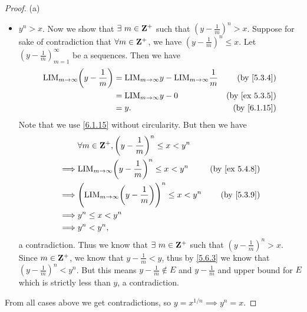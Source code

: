 \begin{proof}{(a)}
\begin{itemize}
          But this means \(y + \frac{1}{m} \in E\) and \(y + \frac{1}{m} \leq y\), a contradiction.
    \item \(y^n > x\).
          Now we show that \(\exists\ m \in \mathbf{Z}^+\) such that \((y - \frac{1}{m})^n > x\).
          Suppose for sake of contradiction that \(\forall m \in \mathbf{Z}^+\), we have \((y - \frac{1}{m})^n \leq x\).
          Let \((y - \frac{1}{m})_{m = 1}^\infty\) be a sequences.
          Then we have
          \begin{align*}
            \text{LIM}_{m \to \infty} \bigg(y - \frac{1}{m}\bigg) & = \text{LIM}_{m \to \infty} y - \text{LIM}_{m \to \infty} \frac{1}{m} & \text{(by \cref{5.3.4})}    \\
                                                                  & = \text{LIM}_{m \to \infty} y - 0                                     & \text{(by \cref{ex 5.3.5})} \\
                                                                  & = y.                                                                  & \text{(by \cref{6.1.15})}
          \end{align*}
          Note that we use \cref{6.1.15} without circularity.
          But then we have
          \begin{align*}
                     & \forall m \in \Z^+, \bigg(y - \frac{1}{m}\bigg)^n \leq x < y^n                                                 \\
            \implies & \text{LIM}_{m \to \infty} \bigg(y - \frac{1}{m}\bigg)^n \leq x < y^n             & \text{(by \cref{ex 5.4.8})} \\
            \implies & \Bigg(\text{LIM}_{m \to \infty} \bigg(y - \frac{1}{m}\bigg)\Bigg)^n \leq x < y^n & \text{(by \cref{5.3.9})}    \\
            \implies & y^n \leq x < y^n                                                                                               \\
            \implies & y^n < y^n,
          \end{align*}
          a contradiction.
          Thus we know that \(\exists\ m \in \mathbf{Z}^+\) such that \((y - \frac{1}{m})^n > x\).
          Since \(m \in \mathbf{Z}^+\), we know that \(y - \frac{1}{m} < y\), thus by \cref{5.6.3} we know that \((y - \frac{1}{m})^n < y^n\).
          But this means \(y - \frac{1}{m} \notin E\) and \(y - \frac{1}{m}\) and upper bound for \(E\) which is strictly less than \(y\), a contradiction.
  \end{itemize}
  From all cases above we get contradictions, so \(y = x^{1 / n} \implies y^n = x\).
\end{proof}


